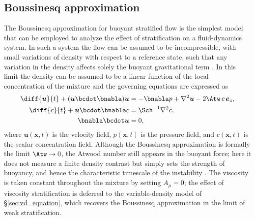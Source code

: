 \subsection{Boussinesq approximation}
\label{sec:bq_equation}
The Boussinesq approximation for buoyant stratified flow is the simplest model that can be employed to analyze the effect of stratification on a fluid-dynamics system. In such a system the flow can be assumed to be incompressible, with small variations of density with respect to a reference state, such that any variation in the density affects solely the buoyant gravitational term \citep{gauthier-schneider-2015}. In this limit the density can be assumed to be a linear function of the local concentration of the mixture and the governing equations are expressed as
\begin{subequations}
    \label{eq:bq_nl_continuous}
    \begin{align}
        \label{eq:bq_nl_continuous_momentum}
        \diff{\boldsymbol{u}}{t} + (\boldsymbol{u}\bcdot\bnabla)\boldsymbol{u} &= -\bnabla p + \nabla^{2}\boldsymbol{u} - 2\Atw\,c\,\boldsymbol{e}_{z}, \\
        \label{eq:bq_nl_continuous_scalar}
        \diff{c}{t} + \boldsymbol{u}\bcdot\bnabla c &= \Sch^{-1}\nabla^{2}c, \\
        \label{eq:bq_nl_continuous_continuity}
        \bnabla\bcdot\boldsymbol{u} &= 0,
    \end{align}
\end{subequations}
where \(\boldsymbol{u}(\boldsymbol{x},t)\) is the velocity field, \(p(\boldsymbol{x},t)\) is the pressure field, and \(c(\boldsymbol{x},t)\) is the scalar concentration field. Although the Boussinesq approximation is formally the limit \(\Atw\to 0\), the Atwood number still appears in the buoyant force; here it does not measure a finite density contrast but simply sets the strength of buoyancy, and hence the characteristic timescale of the instability \citep{boffetta-mazzino-2017}. The viscosity is taken constant throughout the mixture by setting \(A_{\mu}=0\); the effect of viscosity stratification is deferred to the variable-density model of \S\ref{sec:vd_equation}, which recovers the Boussinesq approximation in the limit of weak stratification.

